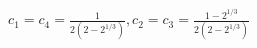 \documentclass[preview]{standalone}
\begin{document}
\begin{align*}
c_1=c_4=\frac{1}{2(2-2^{1/3})}, c_2=c_3=\frac{1-2^{1/3}}{2(2-2^{1/3})}
\end{align*}
\end{document}
